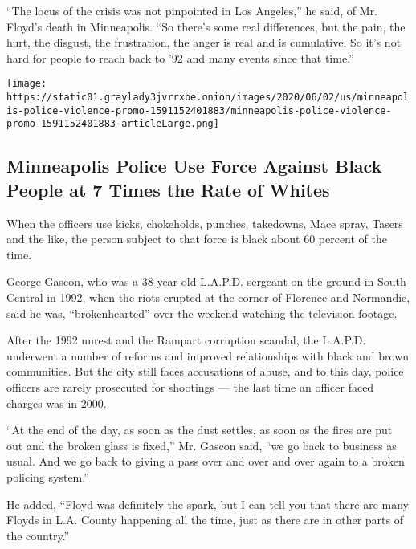 ``The locus of the crisis was not pinpointed in Los Angeles,'' he said,
of Mr. Floyd's death in Minneapolis. ``So there's some real differences,
but the pain, the hurt, the disgust, the frustration, the anger is real
and is cumulative. So it's not hard for people to reach back to '92 and
many events since that time.''

\href{https://www.nytimes3xbfgragh.onion/interactive/2020/06/03/us/minneapolis-police-use-of-force.html}{}

\texttt{[image: https://static01.graylady3jvrrxbe.onion/images/2020/06/02/us/minneapolis-police-violence-promo-1591152401883/minneapolis-police-violence-promo-1591152401883-articleLarge.png]}

\hypertarget{minneapolis-police-use-force-against-black-people-at-7-times-the-rate-of-whites}{%
\subsection{Minneapolis Police Use Force Against Black People at 7 Times
the Rate of
Whites}\label{minneapolis-police-use-force-against-black-people-at-7-times-the-rate-of-whites}}

When the officers use kicks, chokeholds, punches, takedowns, Mace spray,
Tasers and the like, the person subject to that force is black about 60
percent of the time.

George Gascon, who was a 38-year-old L.A.P.D. sergeant on the ground in
South Central in 1992, when the riots erupted at the corner of Florence
and Normandie, said he was, ``brokenhearted'' over the weekend watching
the television footage.

After the 1992 unrest and the Rampart corruption scandal, the L.A.P.D.
underwent a number of reforms and improved relationships with black and
brown communities. But the city still faces accusations of abuse, and to
this day, police officers are rarely prosecuted for shootings --- the
last time an officer faced charges was in 2000.

``At the end of the day, as soon as the dust settles, as soon as the
fires are put out and the broken glass is fixed,'' Mr. Gascon said, ``we
go back to business as usual. And we go back to giving a pass over and
over and over again to a broken policing system.''

He added, ``Floyd was definitely the spark, but I can tell you that
there are many Floyds in L.A. County happening all the time, just as
there are in other parts of the country.''

